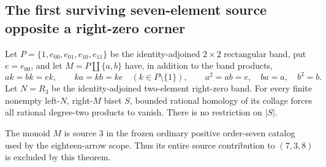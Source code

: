\subsection{The first surviving seven-element source opposite a right-zero corner}

\begin{theorem}
\label{CP2:A-seven-source-three-right-zero}
Let $P=\{1,e_{00},e_{01},e_{10},e_{11}\}$ be the identity-adjoined
$2\times2$ rectangular band, put $e=e_{00}$, and let
$M=P\amalg\{a,b\}$ have, in addition to the band products,
\[
 ak=bk=ek,\qquad ka=kb=ke\quad(k\in P\setminus\{1\}),
 \qquad a^2=ab=e,\quad ba=a,\quad b^2=b.
\]
Let $N=R_3$ be the identity-adjoined two-element right-zero band.
For every finite nonempty left-$N$, right-$M$ biset $S$, bounded
rational homology of its collage forces all rational degree-two
products to vanish.  There is no restriction on $|S|$.

The monoid $M$ is source $3$ in the frozen ordinary positive
order-seven catalog used by the eighteen-arrow scope.  Thus its
entire source contribution to $(7,3,8)$ is excluded by this theorem.
\end{theorem}
